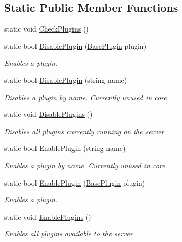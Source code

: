 \subsection*{Static Public Member Functions}
\begin{DoxyCompactItemize}
\item 
static void \hyperlink{classOTA_1_1PluginManager_a0f100a492a49bd01404c15ed69c918d7}{Check\+Plugins} ()
\item 
static bool \hyperlink{classOTA_1_1PluginManager_a4e4518be230f963f269666769eb8d2ae}{Disable\+Plugin} (\hyperlink{classOTA_1_1Plugin_1_1BasePlugin}{Base\+Plugin} plugin)
\begin{DoxyCompactList}\small\item\em Enables a plugin. \end{DoxyCompactList}\item 
static bool \hyperlink{classOTA_1_1PluginManager_adf1d72881b99fb5f7fbea6222bd42347}{Disable\+Plugin} (string name)
\begin{DoxyCompactList}\small\item\em Disables a plugin by name. Currently unused in core \end{DoxyCompactList}\item 
static void \hyperlink{classOTA_1_1PluginManager_a3103a6c0625da2664799c5dd9732f286}{Disable\+Plugins} ()
\begin{DoxyCompactList}\small\item\em Disables all plugins currently running on the server \end{DoxyCompactList}\item 
static bool \hyperlink{classOTA_1_1PluginManager_a29f358bb304f4f908bacf5b94e5f5bf9}{Enable\+Plugin} (string name)
\begin{DoxyCompactList}\small\item\em Enables a plugin by name. Currently unused in core \end{DoxyCompactList}\item 
static bool \hyperlink{classOTA_1_1PluginManager_af95160b00bc6e8aa711d95ea0ba12050}{Enable\+Plugin} (\hyperlink{classOTA_1_1Plugin_1_1BasePlugin}{Base\+Plugin} plugin)
\begin{DoxyCompactList}\small\item\em Enables a plugin. \end{DoxyCompactList}\item 
static void \hyperlink{classOTA_1_1PluginManager_ad1e4d07d81e302b378d5e38c106e4e0a}{Enable\+Plugins} ()
\begin{DoxyCompactList}\small\item\em Enables all plugins available to the server \end{DoxyCompactList}\item 

\end{DoxyCompactItemize}
